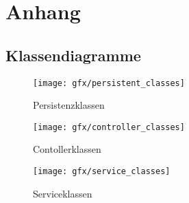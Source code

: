 \section{Anhang}
\subsection{Klassendiagramme}

\begin{figure}[H]
  \centering
  \texttt{[image: gfx/persistent\_classes]}
  \caption{Persistenzklassen}
\end{figure}

\begin{figure}[H]
  \centering
  \texttt{[image: gfx/controller\_classes]}
  \caption{Contollerklassen}
\end{figure}

\begin{figure}[H]
  \centering
  \texttt{[image: gfx/service\_classes]}
  \caption{Serviceklassen}
\end{figure}

